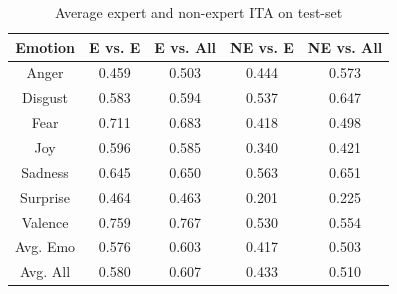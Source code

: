 \documentclass[11pt]{article}
\newlength{\tableReduceBot}
\begin{document}

\begin{table}[h]
\footnotesize
    \begin{center}
        \begin{tabular}{|c||c|c||c|c|}
        \hline
        Emotion & E vs. E & E vs. All & NE vs. E & NE vs. All\\
        \hline
        Anger & 0.459 & 0.503 & 0.444 & 0.573 \\
        Disgust & 0.583 & 0.594 & 0.537 & 0.647 \\
        Fear & 0.711 & 0.683 & 0.418 & 0.498 \\
        Joy & 0.596 & 0.585 & 0.340 & 0.421 \\
        Sadness & 0.645 & 0.650 & 0.563 & 0.651 \\
        Surprise & 0.464 & 0.463 & 0.201 & 0.225 \\
        Valence & 0.759 & 0.767 & 0.530 &  0.554 \\
        \hline
        Avg. Emo & 0.576 & 0.603 & 0.417 & 0.503 \\
        Avg. All & 0.580 & 0.607 &  0.433 &  0.510 \\
        \hline
        
        \end{tabular}
    \caption{Average expert and non-expert ITA on test-set}\label{affectITA1}
\end{center}
\end{table}
\end{document}
